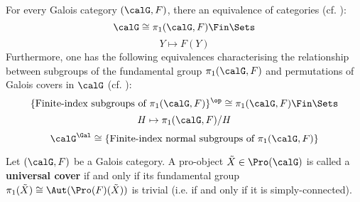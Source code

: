             \begin{proposition} \label{prop: categorical_galois_correspondence}
                For every Galois category $(\calG, F)$, there an equivalence of categories (cf. \cite[Propositions 5.2]{SGA1}):
                    $$\calG \cong \pi_1(\calG, F)\-\Fin\Sets$$
                    $$Y \mapsto F(Y)$$
                Furthermore, one has the following equivalences characterising the relationship between subgroups of the fundamental group $\pi_1(\calG, F)$ and permutations of Galois covers in $\calG$ (cf. \cite[Propositions 5.5]{SGA1}):
                    $$\{\text{Finite-index subgroups of $\pi_1(\calG, F)$}\}^{\op} \cong \pi_1(\calG, F)\-\Fin\Sets$$
                    $$H \mapsto \pi_1(\calG, F)/H$$
                    $$\calG^{\Gal} \cong \{\text{Finite-index normal subgroups of $\pi_1(\calG, F)$}\}$$
            \end{proposition}
                
            \begin{definition} \label{def: universal_covers}
                Let $(\calG, F)$ be a Galois category. A pro-object $\tilde{X} \in \Pro(\calG)$ is called a \textbf{universal cover} if and only if its fundamental group $\pi_1(\tilde{X}) \cong \Aut(\Pro(F)(\tilde{X}))$ is trivial (i.e. if and only if it is simply-connected).
            \end{definition}
            \begin{remark} \label{remark: fundamental_groups_are_automorphism_groups_of_universal_covers}
                
            \end{remark}